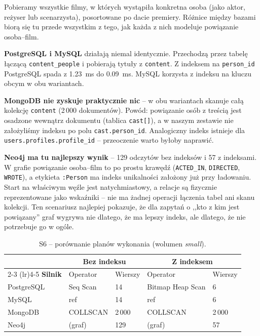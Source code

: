 Pobieramy wszystkie filmy, w których wystąpiła konkretna osoba
(jako aktor, reżyser lub scenarzysta), posortowane po dacie
premiery. Różnice między bazami biorą się tu przede wszystkim
z tego, jak każda z nich modeluje powiązanie osoba--film.

\textbf{PostgreSQL i MySQL} działają niemal identycznie. Przechodzą
przez tabelę łączącą \texttt{content\_people} i pobierają tytuły
z \texttt{content}. Z indeksem na \texttt{person\_id} PostgreSQL
spada z 1.23~ms do 0.09~ms. MySQL korzysta z indeksu na kluczu
obcym w obu wariantach.

\textbf{MongoDB nie zyskuje praktycznie nic} -- w obu wariantach
skanuje całą kolekcję \texttt{content} (2\,000 dokumentów). Powód:
powiązanie osób z treścią jest osadzone wewnątrz dokumentu
(tablica \texttt{cast[]}), a w naszym zestawie nie założyliśmy
indeksu po polu \texttt{cast.person\_id}. Analogiczny indeks
istnieje dla \texttt{users.profiles.profile\_id} -- przeoczenie
warto byłoby naprawić.

\textbf{Neo4j ma tu najlepszy wynik} -- 129 odczytów bez
indeksów i 57 z indeksami. W grafie powiązanie osoba--film to
po prostu krawędź (\texttt{ACTED\_IN}, \texttt{DIRECTED},
\texttt{WROTE}), a etykieta \texttt{:Person} ma indeks unikalności
założony już przy ładowaniu. Start na właściwym węźle jest
natychmiastowy, a relacje są fizycznie reprezentowane jako
wskaźniki -- nie ma żadnej operacji łączenia tabel ani skanu
kolekcji. Ten scenariusz najlepiej pokazuje, że dla zapytań
o ,,kto z kim jest powiązany'' graf wygrywa nie dlatego, że ma
lepszy indeks, ale dlatego, że nie potrzebuje go w ogóle.

\begin{table}[H]
    \centering
    \small
    \begin{tabular}{lllll}
        \toprule
        & \multicolumn{2}{c}{\textbf{Bez indeksu}} & \multicolumn{2}{c}{\textbf{Z indeksem}} \\
        \cmidrule(lr){2-3} \cmidrule(lr){4-5}
        \textbf{Silnik} & Operator & Wierszy & Operator & Wierszy \\
        \midrule
        PostgreSQL & Seq Scan & 14       & Bitmap Heap Scan & 6 \\
        MySQL      & ref      & 14       & ref              & 6 \\
        MongoDB    & COLLSCAN & 2\,000   & COLLSCAN         & 2\,000 \\
        Neo4j      & (graf)   & 129      & (graf)           & 57 \\
        \bottomrule
    \end{tabular}
    \caption{S6 -- porównanie planów wykonania (wolumen \emph{small}).}
    \label{tab:explain_s6}
\end{table}

